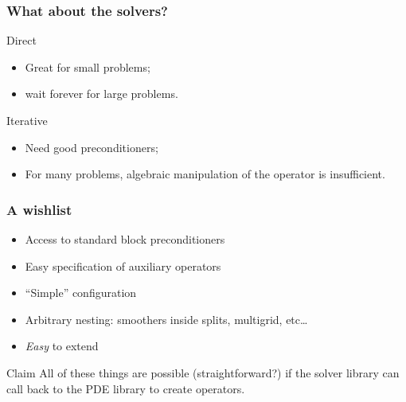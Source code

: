 \documentclass[presentation,aspectratio=43]{beamer}
\begin{document}
\begin{frame}[t]
  \frametitle{What about the solvers?}
  \begin{block}{Direct}
    \begin{itemize}
    \item Great for small problems;
    \item wait forever for large problems.
    \end{itemize}
  \end{block}
  \begin{block}{Iterative}
    \begin{itemize}
    \item Need good preconditioners;
    \item For many problems, algebraic manipulation of the operator is
      insufficient.
    \end{itemize}
  \end{block}
\end{frame}

\begin{frame}
  \frametitle{A wishlist}
  \begin{itemize}
  \item Access to standard block preconditioners
  \item Easy specification of auxiliary operators
  \item ``Simple'' configuration
  \item Arbitrary nesting: smoothers inside splits, multigrid,
    etc\ldots
  \item \emph{Easy} to extend
  \end{itemize}

  \begin{block}{Claim}
    \vspace{0.2ex}
    All of these things are possible (straightforward?) if the solver
    library can call back to the PDE library to create operators.
  \end{block}
\end{frame}
\end{document}
